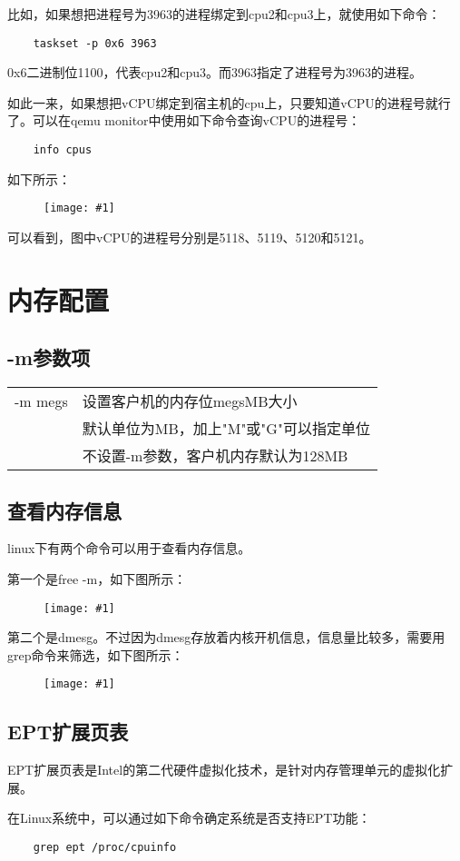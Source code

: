 \documentclass[a4paper,left=2.5cm,right=2.5cm,11pt]{article}
\newcommand{\fic}[1]{\begin{figure}[H]
		\center
		\texttt{[image: \#1]}
	\end{figure}}
\begin{document}
	比如，如果想把进程号为3963的进程绑定到cpu2和cpu3上，就使用如下命令：
	\begin{lstlisting}
	taskset -p 0x6 3963
	\end{lstlisting}

	0x6二进制位1100，代表cpu2和cpu3。而3963指定了进程号为3963的进程。\par
	如此一来，如果想把vCPU绑定到宿主机的cpu上，只要知道vCPU的进程号就行了。可以在qemu monitor中使用如下命令查询vCPU的进程号：
	\begin{lstlisting}
	info cpus
	\end{lstlisting}

	如下所示：
	\fic{8.png}

	可以看到，图中vCPU的进程号分别是5118、5119、5120和5121。

\clearpage

\section{内存配置}
\subsection{-m参数项}
\begin{longtable}{p{2cm}p{8cm}}
\hline
-m megs & 设置客户机的内存位megsMB大小 \\
	    & 默认单位为MB，加上"M"或"G"可以指定单位 \\
		& 不设置-m参数，客户机内存默认为128MB \\
\hline
\end{longtable}
\subsection{查看内存信息}
	linux下有两个命令可以用于查看内存信息。\par
	第一个是free -m，如下图所示：
	\fic{10.png}

	第二个是dmesg。不过因为dmesg存放着内核开机信息，信息量比较多，需要用grep命令来筛选，如下图所示：
	\fic{9.png}

\subsection{EPT扩展页表}
	EPT扩展页表是Intel的第二代硬件虚拟化技术，是针对内存管理单元的虚拟化扩展。\par
	在Linux系统中，可以通过如下命令确定系统是否支持EPT功能：
	\begin{lstlisting}
	grep ept /proc/cpuinfo
	\end{lstlisting}
\end{document}
